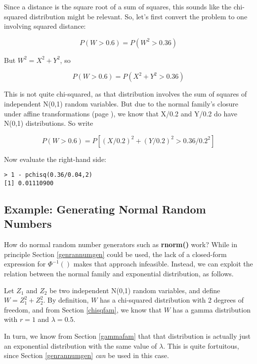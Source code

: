 Since a distance is the square root of a sum of squares, this sounds
like the chi-squared distribution might be relevant.  So, let's first
convert the problem to one involving squared distance:

\begin{equation}
P(W > 0.6) = P(W^2 > 0.36)
\end{equation}

But $W^2 = X^2 + Y^2$, so

\begin{equation}
P(W > 0.6) = P(X^2 + Y^2 > 0.36)
\end{equation}

This is not quite chi-squared, as that distribution involves the sum of
squares of independent N(0,1) random variables.  But due to the normal
family's closure under affine transformations (page \pageref{affine}),
we know that X/0.2 and Y/0.2 do have N(0,1) distributions.  So write

\begin{equation}
P(W > 0.6) = P[(X/0.2)^2 + (Y/0.2)^2 > 0.36/0.2^2]
\end{equation}

Now evaluate the right-hand side:

\begin{lstlisting}
> 1 - pchisq(0.36/0.04,2)
[1] 0.01110900
\end{lstlisting}

\subsection{Example:  Generating Normal Random Numbers}

How do normal random number generators such as {\bf rnorm()} work?
While in principle Section \ref{genrannumgen} could be used, the lack of
a closed-form expression for $\Phi^{-1}()$ makes that approach
infeasible.  Instead, we can exploit the relation between the normal
family and exponential distribution, as follows.

Let $Z_1$ and $Z_2$ be two independent N(0,1) random variables, and define
$W = Z_1^2 + Z_2^2$.  By definition, $W$ has a chi-squared distribution with
2 degrees of freedom, and from Section \ref{chisqfam}, we know that $W$
has a gamma distribution with $r = 1$ and $\lambda = 0.5$.

In turn, we know from Section \ref{gammafam} that that distribution is
actually just an exponential distribution with the same value of
$\lambda$.  This is quite fortuitous, since Section \ref{genrannumgen}
{\it can} be used in this case.

